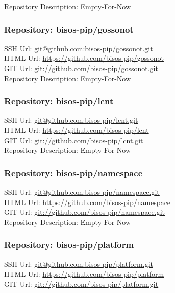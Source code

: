 Repository Description: Empty-For-Now

\subsubsection{Repository: bisos-pip/gossonot}

SSH Url:  \url{git@github.com:bisos-pip/gossonot.git}\\
HTML Url: \url{https://github.com/bisos-pip/gossonot}\\
GIT Url:  \url{git://github.com/bisos-pip/gossonot.git}\\


Repository Description: Empty-For-Now

\subsubsection{Repository: bisos-pip/lcnt}

SSH Url:  \url{git@github.com:bisos-pip/lcnt.git}\\
HTML Url: \url{https://github.com/bisos-pip/lcnt}\\
GIT Url:  \url{git://github.com/bisos-pip/lcnt.git}\\


Repository Description: Empty-For-Now

\subsubsection{Repository: bisos-pip/namespace}

SSH Url:  \url{git@github.com:bisos-pip/namespace.git}\\
HTML Url: \url{https://github.com/bisos-pip/namespace}\\
GIT Url:  \url{git://github.com/bisos-pip/namespace.git}\\


Repository Description: Empty-For-Now

\subsubsection{Repository: bisos-pip/platform}

SSH Url:  \url{git@github.com:bisos-pip/platform.git}\\
HTML Url: \url{https://github.com/bisos-pip/platform}\\
GIT Url:  \url{git://github.com/bisos-pip/platform.git}\\


